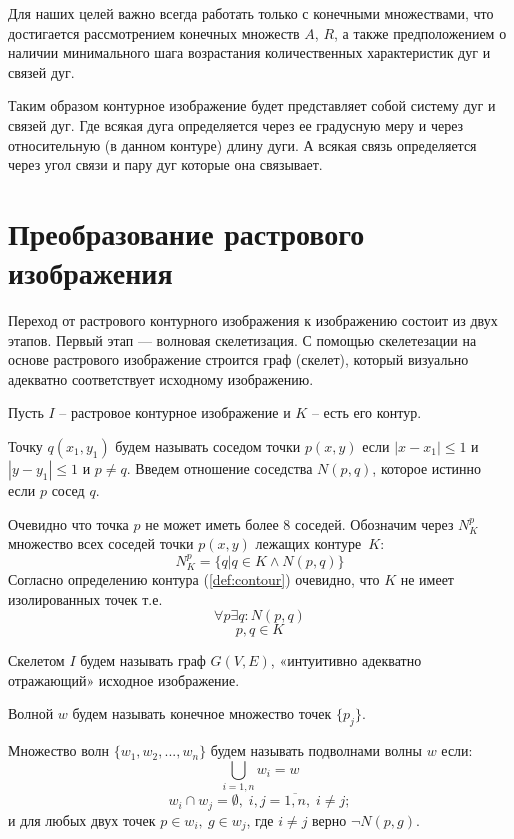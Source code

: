 Для наших целей важно всегда работать только с конечными множествами, что достигается рассмотрением конечных множеств $A$, $R$, а также предположением о наличии минимального шага возрастания количественных характеристик дуг и связей дуг.

Таким образом контурное изображение будет представляет собой систему дуг и связей дуг. Где всякая дуга определяется через ее градусную меру и через относительную (в данном контуре) длину дуги. А всякая связь определяется через угол связи и пару дуг которые она связывает.

\section{Преобразование растрового изображения}
Переход от растрового контурного изображения к изображению состоит из двух этапов. Первый этап — волновая скелетизация. С помощью скелетезации на основе растрового изображение строится граф (скелет), который визуально адекватно соответствует исходному изображению.

Пусть $I$ -- растровое контурное изображение и $K$ -- есть его контур.

\begin{definition}
Точку $q(x_1, y_1)$ будем называть соседом точки $p(x, y)$ если $|x-x_1| \le 1$ и $|y-y_1| \le 1$ и $p\neq q$.
Введем отношение соседства $N(p,q)$, которое истинно если $p$ сосед $q$.
\end{definition}

Очевидно что точка $p$ не может иметь более 8 соседей. Обозначим через $N_K^p$ множество всех соседей точки $p(x,y)$ лежащих контуре~$K$:
$$N_K^p = \{q | q\in K \wedge N(p,q)\}$$
Согласно определению контура (\ref{def:contour}) очевидно, что $K$ не имеет изолированных точек т.е.
$$\forall p \exists q: N(p,q)$$
$$p,q\in K$$

\begin{remark}
Скелетом $I$ будем называть граф $G(V,E)$, «интуитивно адекватно отражающий» исходное изображение.
\end{remark}

\begin{definition}
Волной $w$ будем называть конечное множество точек $\{p_j\}$.
\end{definition}

\begin{definition}
Множество волн $\{w_1,w_2,...,w_n\}$ будем называть подволнами волны $w$ если:
$$\bigcup\limits_{i=1,n}{w_i} = w$$
$$w_i\cap w_j = \emptyset,\; i,j = \overline{1,n},\; i\neq j;$$
и для любых двух точек $p\in w_i,\: g\in w_j$, где $i\neq j$ верно $\neg N(p,g)$.
\end{definition}

